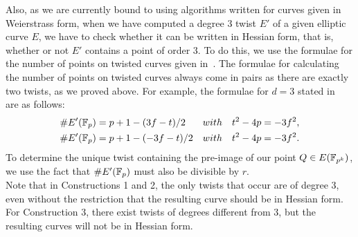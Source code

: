 
Also, as we are currently bound to using algorithms written for curves given in Weierstrass form, when we have computed a degree 3 twist $E'$ of a given elliptic curve $E$, we have to check whether it can be written in Hessian form, that is, whether or not $E'$ contains a point of order 3. To do this, we use the formulae for the number of points on twisted curves given in~\cite{2006/hess}.
The formulae for calculating the number of points on twisted curves always come in pairs as there are exactly two twists, as we proved above.
For example, the formulae for $d = 3$ stated in~\cite{2006/hess} are as follows:
\begin{align*}
\# E' (\mathbb{F}_{p}) &= p + 1 - (3f - t) / 2 & with & \quad t^2 - 4p = -3f^2, \\
\# E' (\mathbb{F}_{p}) &= p + 1 - (-3f- t) / 2 & with & \quad t^2 - 4p = -3f^2.
\end{align*}
To determine the unique twist containing the pre-image of our point $Q \in E(\mathbb{F}_{p^{k}})$,
we use the fact that $\#E'(\mathbb{F}_{p})$ must also be divisible by $r$.
\\
Note that in Constructions 1 and 2, the only twists that occur are of degree 3, even without the restriction that the resulting curve should be in Hessian form. For Construction 3, there exist twists of degrees different from 3, but the resulting curves will not be in Hessian form.

